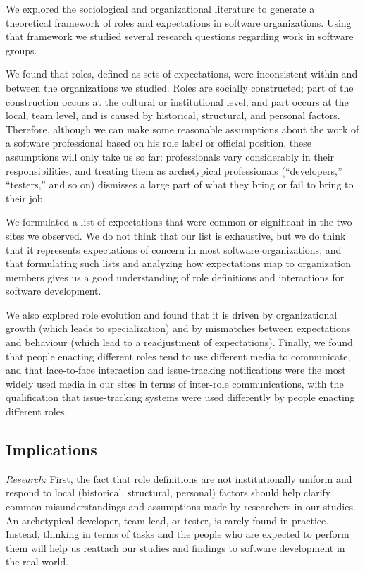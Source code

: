 \documentclass[10pt, conference, compsocconf]{IEEEtran}
\begin{document}
We explored the sociological and organizational literature to generate a theoretical framework of roles and expectations in software organizations. Using that framework we studied several research questions regarding work in software groups.

We found that roles, defined as sets of expectations, were inconsistent within and between the organizations we studied. Roles are socially constructed; part of the construction occurs at the cultural or institutional level, and part occurs at the local, team level, and is caused by historical, structural, and personal factors. Therefore, although we can make some reasonable assumptions about the work of a software professional based on his role label or official position, these assumptions will only take us so far: professionals vary considerably in their responsibilities, and treating them as archetypical professionals (``developers,'' ``testers,'' and so on) dismisses a large part of what they bring or fail to bring to their job.

We formulated a list of expectations that were common or significant in the two sites we observed. We do not think that our list is exhaustive, but we do think that it represents expectations of concern in most software organizations, and that formulating such lists and analyzing how expectations map to organization members gives us a good understanding of role definitions and interactions for software development.

We also explored role evolution and found that it is driven by organizational growth (which leads to specialization) and by mismatches between expectations and behaviour (which lead to a readjustment of expectations). Finally, we found that people enacting different roles tend to use different media to communicate, and that face-to-face interaction and issue-tracking notifications were the most widely used media in our sites in terms of inter-role communications, with the qualification that issue-tracking systems were used differently by people enacting different roles.


\subsection{Implications}

\emph{Research:} First, the fact that role definitions are not institutionally uniform and respond to local (historical, structural, personal) factors should help clarify common misunderstandings and assumptions made by researchers in our studies. An archetypical developer, team lead, or tester, is rarely found in practice. Instead, thinking in terms of tasks and the people who are expected to perform them will help us reattach our studies and findings to software development in the real world.
\end{document}
